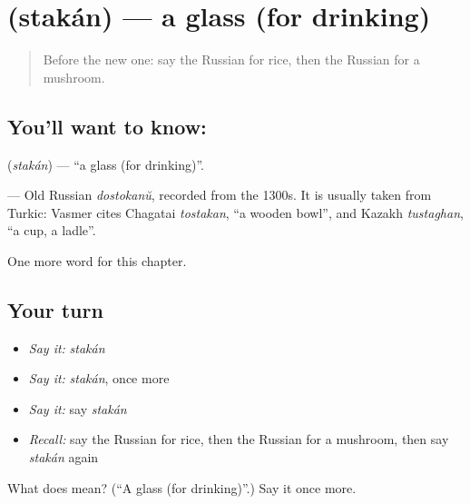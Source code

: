 \section[\texorpdfstring{\ru{стакан} (stakán)}{стакан (stakán)}]{ (stakán) — a glass (for drinking)}

\label{lesson:RU-C47-glass}



\begin{quote}
Before the new one: say the Russian for rice, then the Russian for a mushroom.
\end{quote}

\subsection*{You'll want to know: }
\textbf{} (\emph{stakán}) — \textquotedblleft{}a glass (for drinking)\textquotedblright{}.

\begin{cousinweb}
\textbf{} — Old Russian \emph{dostokanŭ}, recorded from the 1300s. It is usually taken from Turkic: Vasmer cites Chagatai \emph{tostakan}, \textquotedblleft{}a wooden bowl\textquotedblright{}, and Kazakh \emph{tustaghan}, \textquotedblleft{}a cup, a ladle\textquotedblright{}.
\end{cousinweb}

\begin{grammarlens}[title={What you've built}]
One more word for this chapter.
\end{grammarlens}

\subsection*{Your turn}
\begin{itemize}
\raggedright
  \item \emph{Say it:} \emph{stakán}
  \item \emph{Say it:} \emph{stakán}, once more
  \item \emph{Say it:} say \emph{stakán}
  \item \emph{Recall:} say the Russian for rice, then the Russian for a mushroom, then say \emph{stakán} again
\end{itemize}

\begin{tcolorbox}[breakable,colback=teal!4,colframe=teal!35!black,title={Before you move on}]
What does  mean? (\textquotedblleft{}A glass (for drinking)\textquotedblright{}.) Say it once more.
\end{tcolorbox}
